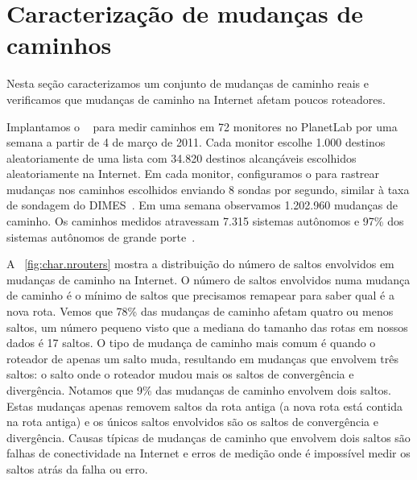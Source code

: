 \section{Caracterização de mudanças de caminhos}
\label{sec:char}

Nesta seção caracterizamos um conjunto de mudanças de caminho reais e
verificamos que mudanças de caminho na Internet afetam poucos
roteadores.

Implantamos o \dtrack{}~\cite{cunha11dtrack} para medir caminhos em 72
monitores no PlanetLab por uma semana a partir de 4 de março de 2011.
Cada monitor escolhe 1.000 destinos aleatoriamente de uma lista com
34.820 destinos alcançáveis escolhidos aleatoriamente na Internet.  Em
cada monitor, configuramos o \dtrack{} para rastrear mudanças nos
caminhos escolhidos enviando 8 sondas por segundo, similar à taxa de
sondagem do DIMES~\cite{shavitt09dimes}.  Em uma semana observamos
1.202.960 mudanças de caminho.  Os caminhos medidos atravessam 7.315
sistemas autônomos e 97\% dos sistemas autônomos de grande
porte~\cite{oliveira08as2tier}.

A \figstr~\ref{fig:char.nrouters} mostra a distribuição do número de
saltos envolvidos em mudanças de caminho na Internet.  O número de
saltos envolvidos numa mudança de caminho é o mínimo de saltos que
precisamos remapear para saber qual é a nova rota.  Vemos que 78\% das
mudanças de caminho afetam quatro ou menos saltos, um número pequeno
visto que a mediana do tamanho das rotas em nossos dados é 17 saltos.  O
tipo de mudança de caminho mais comum é quando o roteador de apenas um
salto muda, resultando em mudanças que envolvem três saltos: o salto
onde o roteador mudou mais os saltos de convergência e divergência.
Notamos que 9\% das mudanças de caminho envolvem dois saltos.  Estas
mudanças apenas removem saltos da rota antiga (a nova rota está contida
na rota antiga) e os únicos saltos envolvidos são os saltos de
convergência e divergência.  Causas típicas de mudanças de caminho que
envolvem dois saltos são falhas de conectividade na Internet e erros de
medição onde é impossível medir os saltos atrás da falha ou erro.  


